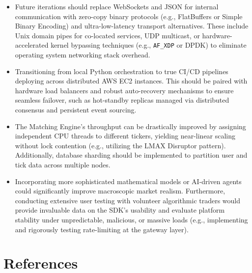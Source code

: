 \documentclass[12pt,a4paper]{article}
\begin{document}
\begin{itemize}
    \item Future iterations should replace WebSockets and JSON for internal communication with zero-copy binary protocols (e.g., FlatBuffers or Simple Binary Encoding) and ultra-low-latency transport alternatives. These include Unix domain pipes for co-located services, UDP multicast, or hardware-accelerated kernel bypassing techniques (e.g., \texttt{AF\_XDP} or DPDK) to eliminate operating system networking stack overhead.
    \item Transitioning from local Python orchestration to true CI/CD pipelines deploying across distributed AWS EC2 instances. This should be paired with hardware load balancers and robust auto-recovery mechanisms to ensure seamless failover, such as hot-standby replicas managed via distributed consensus and persistent event sourcing.
    \item The Matching Engine's throughput can be drastically improved by assigning independent CPU threads to different tickers, yielding near-linear scaling without lock contention (e.g., utilizing the LMAX Disruptor pattern). Additionally, database sharding should be implemented to partition user and tick data across multiple nodes.
    \item Incorporating more sophisticated mathematical models or AI-driven agents could significantly improve macroscopic market realism. Furthermore, conducting extensive user testing with volunteer algorithmic traders would provide invaluable data on the SDK's usability and evaluate platform stability under unpredictable, malicious, or massive loads (e.g., implementing and rigorously testing rate-limiting at the gateway layer).
\end{itemize}


\section{References}
\end{document}
